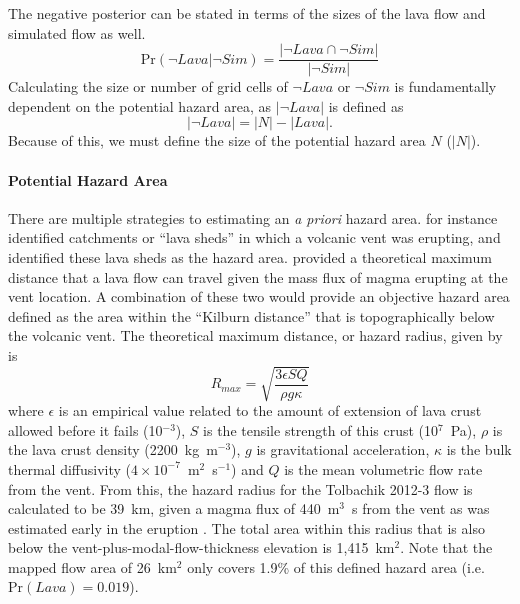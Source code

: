 		The negative posterior can be stated in terms of the sizes of the lava flow and simulated flow as well.
		\begin{equation}
			\text{Pr}(\neg Lava|\neg Sim)=\frac{|\neg Lava\cap \neg Sim|}{|\neg Sim|}\label{eq_simplenegpost}
		\end{equation}
		Calculating the size or number of grid cells of $\neg Lava$ or $\neg Sim$ is fundamentally dependent on the potential hazard area, as $|\neg Lava|$ is defined as
		\begin{equation}
			|\neg Lava| = |N| - |Lava|.
		\end{equation}
		Because of this, we must define the size of the potential hazard area $N$ ($|N|$).	
	
	\paragraph{Potential Hazard Area} There are multiple strategies to estimating an \textit{a priori} hazard area. \citet{kauahikaua1995applications} for instance identified catchments or ``lava sheds'' in which a volcanic vent was erupting, and identified these lava sheds as the hazard area. \citet{kilburn2000lava} provided a theoretical maximum distance that a lava flow can travel given the mass flux of magma erupting at the vent location. A combination of these two would provide an objective hazard area defined as the area within the ``Kilburn distance'' that is topographically below the volcanic vent. The theoretical maximum distance, or hazard radius, given by \citet{kilburn2000lava} is
		\begin{equation}
		R_{max}=\sqrt{\frac{3\epsilon SQ}{\rho g\kappa}}
		\label{eq_kilburn}
		\end{equation}
	where $\epsilon$ is an empirical value related to the amount of extension of lava crust allowed before it fails (10$^{-3}$), $S$ is the tensile strength of this crust (10$^7$~Pa), $\rho$ is the lava crust density (2200~kg~m$^{-3}$), $g$ is gravitational acceleration, $\kappa$ is the bulk thermal diffusivity ($4\times 10^{-7}$~m$^{2}$~s$^{-1}$) and $Q$ is the mean volumetric flow rate from the vent. From this, the hazard radius for the Tolbachik 2012-3 flow is calculated to be 39~km, given a magma flux of 440~m$^3$~s from the vent as was estimated early in the eruption \citep{belousov2015overview}. The total area within this radius that is also below the vent-plus-modal-flow-thickness elevation is 1,415~km$^2$. Note that the mapped flow area of 26~km$^2$ only covers 1.9\% of this defined hazard area (i.e. $\text{Pr}(Lava) = 0.019$).
	
